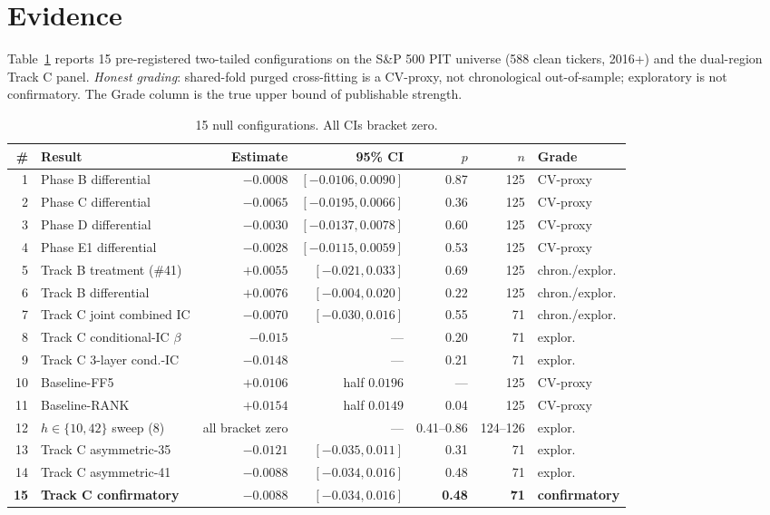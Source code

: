 \documentclass[11pt,a4paper]{article}
\begin{document}
\section{Evidence}\label{sec:evidence}

Table~\ref{tab:evidence} reports 15 pre-registered two-tailed configurations on the
S\&P 500 PIT universe (588 clean tickers, 2016+) and the dual-region Track C panel.
\emph{Honest grading}: shared-fold purged cross-fitting is a CV-proxy, not
chronological out-of-sample; exploratory is not confirmatory. The Grade column is the
true upper bound of publishable strength.

\begin{table}[h]
\centering
\small
\caption{15 null configurations. All CIs bracket zero.}
\label{tab:evidence}
\begin{tabular}{rlrrrrl}
\toprule
\# & Result & Estimate & 95\% CI & $p$ & $n$ & Grade \\
\midrule
1  & Phase B differential        & $-0.0008$ & $[-0.0106, 0.0090]$ & 0.87 & 125 & CV-proxy \\
2  & Phase C differential        & $-0.0065$ & $[-0.0195, 0.0066]$ & 0.36 & 125 & CV-proxy \\
3  & Phase D differential        & $-0.0030$ & $[-0.0137, 0.0078]$ & 0.60 & 125 & CV-proxy \\
4  & Phase E1 differential       & $-0.0028$ & $[-0.0115, 0.0059]$ & 0.53 & 125 & CV-proxy \\
5  & Track B treatment (\#41)    & $+0.0055$ & $[-0.021, 0.033]$   & 0.69 & 125 & chron./explor. \\
6  & Track B differential        & $+0.0076$ & $[-0.004, 0.020]$   & 0.22 & 125 & chron./explor. \\
7  & Track C joint combined IC   & $-0.0070$ & $[-0.030, 0.016]$   & 0.55 &  71 & chron./explor. \\
8  & Track C conditional-IC $\beta$ & $-0.015$ & ---               & 0.20 &  71 & explor. \\
9  & Track C 3-layer cond.-IC    & $-0.0148$ & ---                 & 0.21 &  71 & explor. \\
10 & Baseline-FF5                & $+0.0106$ & half $0.0196$       & ---  & 125 & CV-proxy \\
11 & Baseline-RANK               & $+0.0154$ & half $0.0149$       & 0.04 & 125 & CV-proxy \\
12 & $h\in\{10,42\}$ sweep (8)   & all bracket zero & ---          & 0.41--0.86 & 124--126 & explor. \\
13 & Track C asymmetric-35       & $-0.0121$ & $[-0.035, 0.011]$   & 0.31 &  71 & explor. \\
14 & Track C asymmetric-41       & $-0.0088$ & $[-0.034, 0.016]$   & 0.48 &  71 & explor. \\
\textbf{15} & \textbf{Track C confirmatory} & $\mathbf{-0.0088}$ & $[-0.034, 0.016]$ & \textbf{0.48} & \textbf{71} & \textbf{confirmatory} \\
\bottomrule
\end{tabular}
\end{table}
\end{document}
